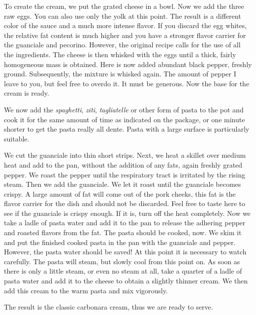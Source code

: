 To create the cream, we put the grated cheese in a bowl. Now we add the three raw eggs. You can also use only the yolk at this point. The result is a different color of the sauce and a much more intense flavor. If you discard the egg whites, the relative fat content is much higher and you have a stronger flavor carrier for the guanciale and pecorino. However, the original recipe calls for the use of all the ingredients. The cheese is then whisked with the eggs until a thick, fairly homogeneous mass is obtained. Here is now added abundant black pepper, freshly ground. Subsequently, the mixture is whisked again. The amount of pepper I leave to you, but feel free to overdo it. It must be generous. Now the base for the cream is ready.

We now add the \emph{spaghetti}, \emph{ziti}, \emph{tagliatelle} or other form of pasta to the pot and cook it for the same amount of time as indicated on the package, or one minute shorter to get the pasta really all dente. Pasta with a large surface is particularly suitable.

We cut the guanciale into thin short strips. Next, we heat a skillet over medium heat and add to the pan, without the addition of any fats, again freshly grated pepper. We roast the pepper until the respiratory tract is irritated by the rising steam. Then we add the guanciale. We let it roast until the guanciale becomes crispy. A large amount of fat will come out of the pork cheeks, this fat is the flavor carrier for the dish and should not be discarded. Feel free to taste here to see if the guanciale is crispy enough. If it is, turn off the heat completely. Now we take a ladle of pasta water and add it to the pan to release the adhering pepper and roasted flavors from the fat. The pasta should be cooked, now. We skim it and put the finished cooked pasta in the pan with the guanciale and pepper. However, the pasta water should be saved! At this point it is necessary to watch carefully. The pasta will steam, but slowly cool from this point on. As soon as there is only a little steam, or even no steam at all, take a quarter of a ladle of pasta water and add it to the cheese to obtain a slightly thinner cream. We then add this cream to the warm pasta and mix vigorously.

The result is the classic carbonara cream, thus we are ready to serve.

